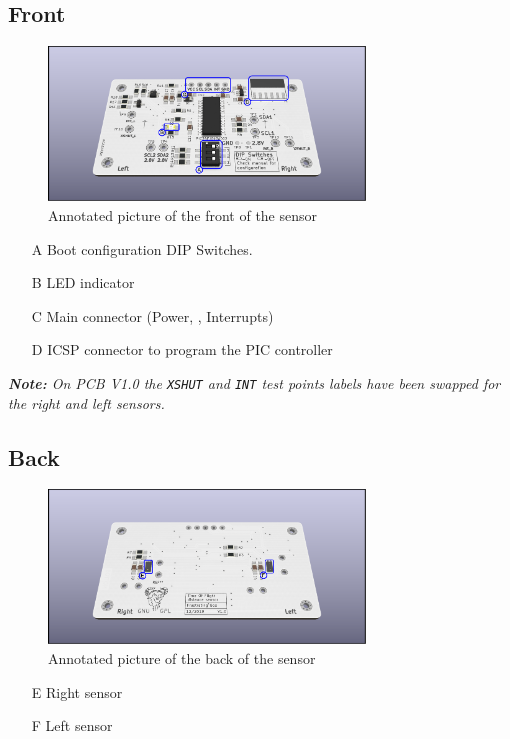 \subsection{Front}
\begin{figure}[h!]
 \centering
 \includegraphics[width=0.75\textwidth]{../img/annotated-layout-front-V1.png}
 \caption{Annotated picture of the front of the sensor}
\end{figure}
\begin{itemize}
 \item[A] Boot configuration DIP Switches.
 \item[B] LED indicator
 \item[C] Main connector (Power, \iic, Interrupts)
 \item[D] ICSP connector to program the PIC controller
\end{itemize}
\textit{\textbf{Note: }On PCB V1.0 the \texttt{XSHUT} and  \texttt{INT} test points labels have been swapped for the right and left sensors.}

\subsection{Back}
\begin{figure}[H]
 \centering
 \includegraphics[width=0.75\textwidth]{../img/annotated-layout-back-V1.png}
 \caption{Annotated picture of the back of the sensor}
\end{figure}
\begin{itemize}
 \item[E] Right sensor
 \item[F] Left sensor
\end{itemize}